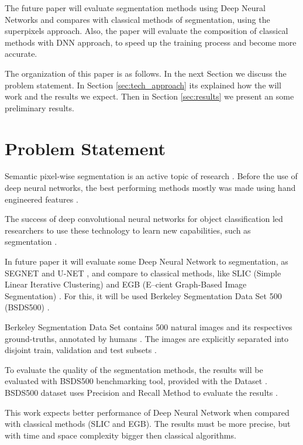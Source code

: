 \documentclass[10pt,twocolumn,letterpaper]{article}
\begin{document}
The future paper will evaluate segmentation methods using Deep Neural Networks and compares with classical methods of segmentation, using the superpixels approach. Also, the paper will evaluate the composition of classical methods with DNN approach, to speed up the training process and become more accurate.

The organization of this paper is as follows. In the next Section we discuss the problem statement. In Section \ref{sec:tech_approach} its explained how the will work and the results we expect. Then in Section \ref{sec:results} we present an some preliminary results.

\section{Problem Statement} \label{sec:prob_statement}


Semantic pixel-wise segmentation is an active topic of research \cite{SEGNET}. Before
 the use of deep neural networks, the best performing methods mostly
 was made using hand engineered features \cite{SEGNET}.

The success of deep convolutional neural networks for object
 classification led researchers to use these technology to learn new capabilities, such as segmentation \cite{SEGNET}. 

In future paper it will evaluate some Deep Neural Network to segmentation, as SEGNET \cite{SEGNET} and U-NET \cite{UNET}, and compare to classical methods, like SLIC (Simple Linear Iterative Clustering) \cite{SLIC} and EGB (E–cient Graph-Based Image Segmentation) \cite{FELZENSZWALB}. For this, it will be used Berkeley Segmentation Data Set 500 (BSDS500) \cite{BSDS500}.

Berkeley Segmentation Data Set contains 500 natural images and its respectives ground-truths, annotated by humans \cite{BSDS500}. The images are explicitly separated into disjoint train, validation and test subsets \cite{BSDS500}.

To evaluate the quality of the segmentation methods, the results will be evaluated with BSDS500 benchmarking tool, provided with the Dataset \cite{BSDS500}. BSDS500 dataset uses Precision and Recall Method to evaluate the results \cite{BSDS500}.

This work expects better performance of Deep Neural Network when compared with classical methods (SLIC and EGB). The results must be more precise, but with time and space complexity bigger then classical algorithms. 
\end{document}
